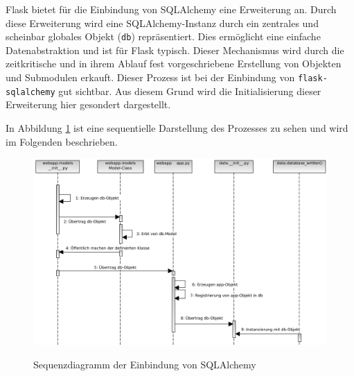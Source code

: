 Flask bietet für die Einbindung von SQLAlchemy eine Erweiterung an.
Durch diese Erweiterung wird eine SQLAlchemy-Instanz durch ein zentrales und scheinbar globales Objekt (\texttt{db}) repräsentiert. Dies ermöglicht eine einfache Datenabstraktion und ist für Flask typisch. Dieser Mechanismus wird durch die zeitkritische und in ihrem Ablauf fest vorgeschriebene Erstellung von Objekten und Submodulen erkauft.
Dieser Prozess ist bei der Einbindung von \texttt{flask-sqlalchemy} gut sichtbar. Aus diesem Grund wird die Initialisierung dieser Erweiterung hier gesondert dargestellt.

In Abbildung \ref{fig:sequenzSQLALCHEMY} ist eine sequentielle Darstellung des Prozesses zu sehen und wird im Folgenden beschrieben.

\begin{figure}[H]
 \centering
 \includegraphics[width=\textwidth]{pix/seq_db.png}
 \label{fig:sequenzSQLALCHEMY}
 \caption{Sequenzdiagramm der Einbindung von SQLAlchemy}
\end{figure}


